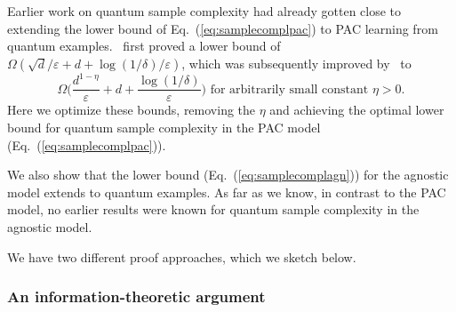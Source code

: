 \documentclass[twoside,11pt]{article}
\newcommand{\eps}{\varepsilon}
\begin{document}
Earlier work on quantum sample complexity had already gotten close to extending the lower bound of Eq.~(\ref{eq:samplecomplpac}) to PAC learning from quantum examples.~\cite{atici&servedio:qlearning} first proved a lower bound of $\Omega(\sqrt{d}/\eps + d + \log(1/\delta)/\eps)$, which was subsequently improved by~\cite{zhang:improvedvcbound} to
\begin{equation}\label{eq:previousbestbound}
\Omega\Big(\frac{d^{1-\eta}}{\eps} + d + \frac{\log(1/\delta)}{\eps}\Big)\mbox{ for arbitrarily small constant }\eta>0.
\end{equation}
Here we optimize these bounds, removing the $\eta$ and achieving the optimal lower bound for quantum sample complexity in the PAC model (Eq.~(\ref{eq:samplecomplpac})). 

We also show that the lower bound (Eq.~(\ref{eq:samplecomplagn})) for the agnostic model extends to quantum examples.
As far as we know, in contrast to the PAC model, no earlier results were known for quantum sample complexity in the agnostic model. 

We have two different proof approaches, which we sketch below.

\subsubsection{An information-theoretic argument}
\end{document}
